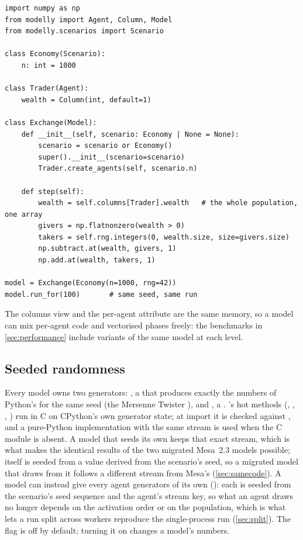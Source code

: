 \begin{lstlisting}[float=tp,caption={A wealth-exchange model whose agents keep their wealth in a column;
the step acts on the whole population at once. Run as shown with \modelly{} 1.5.0.},
label={lst:columns}]
import numpy as np
from modelly import Agent, Column, Model
from modelly.scenarios import Scenario

class Economy(Scenario):
    n: int = 1000

class Trader(Agent):
    wealth = Column(int, default=1)

class Exchange(Model):
    def __init__(self, scenario: Economy | None = None):
        scenario = scenario or Economy()
        super().__init__(scenario=scenario)
        Trader.create_agents(self, scenario.n)

    def step(self):
        wealth = self.columns[Trader].wealth   # the whole population, one array
        givers = np.flatnonzero(wealth > 0)
        takers = self.rng.integers(0, wealth.size, size=givers.size)
        np.subtract.at(wealth, givers, 1)
        np.add.at(wealth, takers, 1)

model = Exchange(Economy(n=1000, rng=42))
model.run_for(100)       # same seed, same run
\end{lstlisting}

The columns view and the per-agent attribute are the same memory, so a model can mix
per-agent code and vectorised phases freely: the benchmarks in \cref{sec:performance} include
variants of the same model at each level.

\subsection{Seeded randomness}

Every model owns two generators: , a  that produces exactly
the numbers of Python's  for the same seed (the Mersenne Twister
\citep{matsumoto1998mersenne}), and , a  .
's hot methods (, , ,
) run in C on CPython's own generator state; at import it is checked against
, and a pure-Python implementation with the same stream is used when the C
module is absent. A model that seeds its own  keeps that exact stream, which is
what makes the identical results of the two migrated Mesa~2.3 models possible; 
itself is seeded from a value derived from the scenario's seed, so a migrated model that draws
from it follows a different stream from Mesa's (\cref{sec:samecode}). A model can instead give every agent generators of its own
(): each is seeded from the scenario's seed sequence and the
agent's stream key, so what an agent draws no longer depends on the activation order or on
the population, which is what lets a run split across workers reproduce the single-process
run (\cref{sec:split}). The flag is off by default; turning it on changes a model's numbers.

